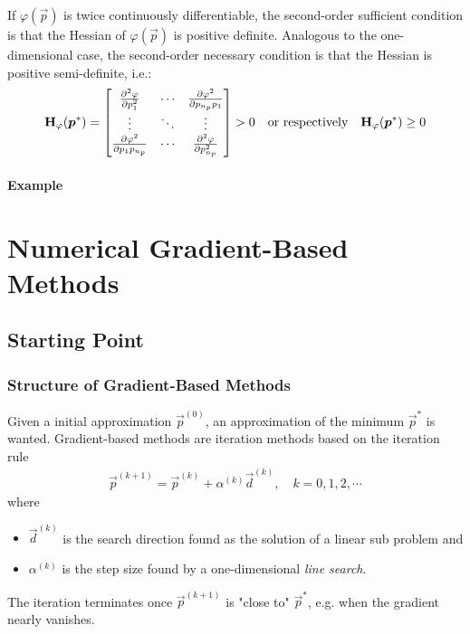 			If \(\varphi(\vec{p})\) is twice continuously differentiable, the second-order sufficient condition is that the Hessian of \(\varphi(\vec{p})\) is positive definite. Analogous to the one-dimensional case, the second-order necessary condition is that the Hessian is positive semi-definite, i.e.:
			\begin{align*}
				\bm{\mathrm{H}}_\varphi(\bm{p}^\ast) =
				\begin{bmatrix}
					\pdv[2]{\varphi}{p_1}        & \cdots & \pdv{\varphi^2}{p_{n_p} p_1} \\
					\vdots                       & \ddots & \vdots                       \\
					\pdv{\varphi^2}{p_1 p_{n_p}} & \cdots & \pdv[2]{\varphi}{p_{n_p}}
				\end{bmatrix}
				> 0
				\quad\text{or respectively}\quad
				\bm{\mathrm{H}}_\varphi(\bm{p}^\ast) \geq 0
			\end{align*}

			\paragraph{Example} %

	\section{Numerical Gradient-Based Methods}
		\subsection{Starting Point}
			\subsubsection{Structure of Gradient-Based Methods}
				Given a initial approximation \( \vec{p}^{(0)} \), an approximation of the minimum \( \vec{p}^\ast \) is wanted. Gradient-based methods are iteration methods based on the iteration rule
				\begin{align*}
					\vec{p}^{(k + 1)} = \vec{p}^{(k)} + \alpha^{(k)} \vec{d}^{(k)},\quad k = 0, 1, 2, \cdots
				\end{align*}
				where
				\begin{itemize}
					\item \(\vec{d}^{(k)}\) is the search direction found as the solution of a linear sub problem and
					\item \(\alpha^{(k)}\) is the step size found by a one-dimensional \emph{line search}.
				\end{itemize}
				The iteration terminates once \( \vec{p}^{(k + 1)} \) is "close to" \(\vec{p}^\ast\), e.g. when the gradient nearly vanishes.

